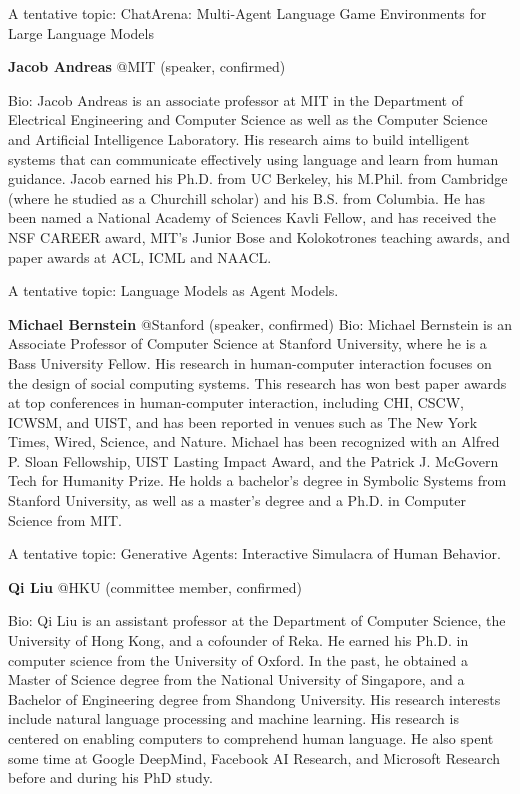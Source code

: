 \documentclass[10pt]{article} %
\begin{document}
A tentative topic: ChatArena: Multi-Agent Language Game Environments for Large Language Models


{\bf Jacob Andreas} @MIT (speaker, confirmed)  

Bio: Jacob Andreas is an associate professor at MIT in the Department of Electrical Engineering and Computer Science as well as the Computer Science and Artificial Intelligence Laboratory. His research aims to build intelligent systems that can communicate effectively using language and learn from human guidance. Jacob earned his Ph.D. from UC Berkeley, his M.Phil. from Cambridge (where he studied as a Churchill scholar) and his B.S. from Columbia. He has been named a National Academy of Sciences Kavli Fellow, and has received the NSF CAREER award, MIT's Junior Bose and Kolokotrones teaching awards, and paper awards at ACL, ICML and NAACL.  

A tentative topic: Language Models as Agent Models.


{\bf Michael Bernstein} @Stanford (speaker, confirmed)  
Bio: Michael Bernstein is an Associate Professor of Computer Science at Stanford University, where he is a Bass University Fellow. His research in human-computer interaction focuses on the design of social computing systems. This research has won best paper awards at top conferences in human-computer interaction, including CHI, CSCW, ICWSM, and UIST, and has been reported in venues such as The New York Times, Wired, Science, and Nature. Michael has been recognized with an Alfred P. Sloan Fellowship, UIST Lasting Impact Award, and the Patrick J. McGovern Tech for Humanity Prize. He holds a bachelor's degree in Symbolic Systems from Stanford University, as well as a master's degree and a Ph.D. in Computer Science from MIT.  

A tentative topic: Generative Agents: Interactive Simulacra of Human Behavior.


{\bf Qi Liu} @HKU (committee member, confirmed)  
  
Bio: Qi Liu is an assistant professor at the Department of Computer Science, the University of Hong Kong, and a cofounder of Reka. He earned his Ph.D. in computer science from the University of Oxford. In the past, he obtained a Master of Science degree from the National University of Singapore, and a Bachelor of Engineering degree from Shandong University. His research interests include natural language processing and machine learning. His research is centered on enabling computers to comprehend human language. He also spent some time at Google DeepMind, Facebook AI Research, and Microsoft Research before and during his PhD study.
\end{document}
